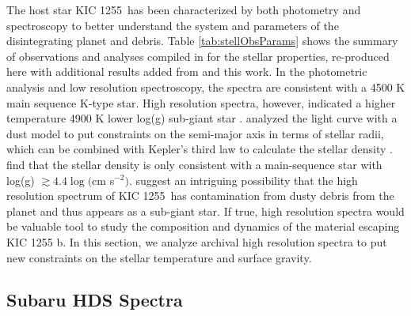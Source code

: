 \documentclass[preprint,trackchanges]{aastex61}
\newcommand{\sha}{KIC 1255 b}
\newcommand{\shStar}{KIC 1255}
\begin{document}
The host star \shStar\ has been characterized by both photometry and spectroscopy to better understand the system and parameters of the disintegrating planet and debris.
Table \ref{tab:stellObsParams} shows the summary of observations and analyses compiled in \citet{vanlieshout2016kic1255} for the stellar properties, re-produced here with additional results added from \citet{morton2016falsePos} and this work.
In the photometric analysis and low resolution spectroscopy, the spectra are consistent with a 4500 K main sequence K-type star.
High resolution spectra, however, indicated a higher temperature 4900 K lower log(g) sub-giant star \citep{kawahara2013starspots}.
\citet{vanlieshout2016kic1255} analyzed the light curve with a dust model to put constraints on the semi-major axis in terms of stellar radii, which can be combined with Kepler's third law to calculate the stellar density \citep{seager2003uniqueSolution}.
\citet{vanlieshout2016kic1255} find that the stellar density is only consistent with a main-sequence star with log(g) $\gtrsim 4.4 \log($cm s$^{-2})$.
\citet{vanlieshout2016kic1255} suggest an intriguing possibility that the high resolution spectrum of \shStar\ has contamination from dusty debris from the planet and thus appears as a sub-giant star.
If true, high resolution spectra would be valuable tool to study the composition and dynamics of the material escaping \sha.
In this section, we analyze archival high resolution spectra to put new constraints on the stellar temperature and surface gravity.

\subsection{Subaru HDS Spectra}\label{sec:SubaruDescrip}
\end{document}
